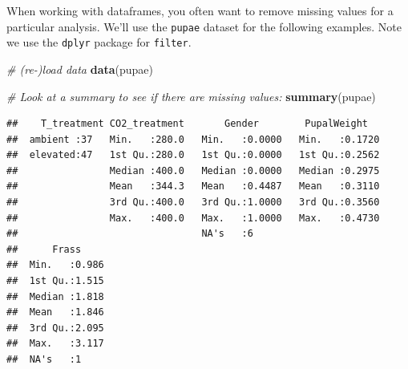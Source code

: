 \documentclass[]{book}
\newenvironment{Shaded}{\begin{snugshade}}{\end{snugshade}}
\newcommand{\CommentTok}[1]{\textcolor[rgb]{0.56,0.35,0.01}{\textit{#1}}}
\newcommand{\KeywordTok}[1]{\textcolor[rgb]{0.13,0.29,0.53}{\textbf{#1}}}
\newcommand{\NormalTok}[1]{#1}
\newcommand{\OperatorTok}[1]{\textcolor[rgb]{0.81,0.36,0.00}{\textbf{#1}}}
\newcommand{\StringTok}[1]{\textcolor[rgb]{0.31,0.60,0.02}{#1}}
\begin{document}
When working with dataframes, you often want to remove missing values for a particular analysis. We'll use the \texttt{pupae} dataset for the following examples. Note we use the \texttt{dplyr} package for \texttt{filter}.

\begin{Shaded}
\begin{Highlighting}[]
\CommentTok{# (re-)load data}
\KeywordTok{data}\NormalTok{(pupae)}

\CommentTok{# Look at a summary to see if there are missing values:}
\KeywordTok{summary}\NormalTok{(pupae)}
\end{Highlighting}
\end{Shaded}

\begin{verbatim}
##    T_treatment CO2_treatment       Gender        PupalWeight    
##  ambient :37   Min.   :280.0   Min.   :0.0000   Min.   :0.1720  
##  elevated:47   1st Qu.:280.0   1st Qu.:0.0000   1st Qu.:0.2562  
##                Median :400.0   Median :0.0000   Median :0.2975  
##                Mean   :344.3   Mean   :0.4487   Mean   :0.3110  
##                3rd Qu.:400.0   3rd Qu.:1.0000   3rd Qu.:0.3560  
##                Max.   :400.0   Max.   :1.0000   Max.   :0.4730  
##                                NA's   :6                        
##      Frass      
##  Min.   :0.986  
##  1st Qu.:1.515  
##  Median :1.818  
##  Mean   :1.846  
##  3rd Qu.:2.095  
##  Max.   :3.117  
##  NA's   :1
\end{verbatim}

\begin{Shaded}
\end{Shaded}
\end{document}
